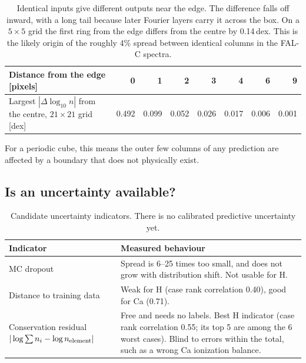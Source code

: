 \begin{table}[H]\centering\small
\begin{tabular}{lrrrrrrr}
\toprule
Distance from the edge [pixels]&0&1&2&3&4&6&9\\\midrule
Largest $|\Delta\log_{10}n|$ from the centre, $21\times21$ grid [dex]&0.492&0.099&0.052&0.026&0.017&0.006&0.001\\\bottomrule
\end{tabular}
\caption{Identical inputs give different outputs near the edge. The difference falls off inward, with a long tail because later Fourier layers carry it across the box. On a $5\times5$ grid the first ring from the edge differs from the centre by 0.14\,dex. This is the likely origin of the roughly 4\% spread between identical columns in the FAL-C spectra.}
\end{table}

For a periodic cube, this means the outer few columns of any prediction are affected by a boundary that does not physically exist.

\subsection{Is an uncertainty available?}
\begin{table}[H]\centering\small
\begin{tabularx}{\linewidth}{lY}
\toprule
Indicator&Measured behaviour\\\midrule
MC dropout&Spread is 6--25 times too small, and does not grow with distribution shift. Not usable for H.\\
Distance to training data&Weak for H (case rank correlation 0.40), good for Ca (0.71).\\
Conservation residual $|\log\sum n_i-\log n_{\rm element}|$&Free and needs no labels. Best H indicator (case rank correlation 0.55; its top 5 are among the 6 worst cases). Blind to errors within the total, such as a wrong Ca ionization balance.\\\bottomrule
\end{tabularx}
\caption{Candidate uncertainty indicators. There is no calibrated predictive uncertainty yet.}
\end{table}

